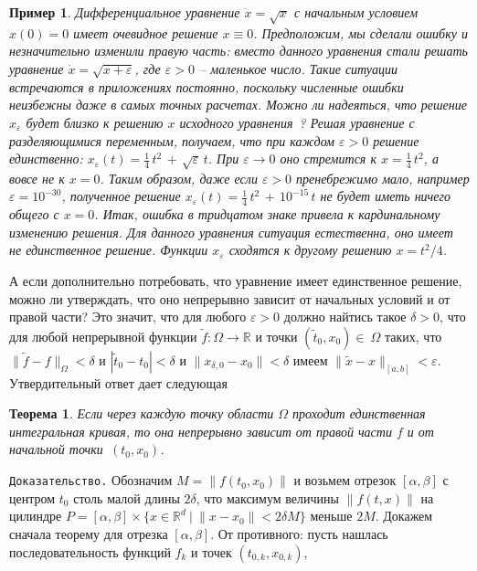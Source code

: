 \documentclass[12pt,a4paper]{article}
\newtheorem{theorem}{Теорема}
\newtheorem{ex}{Пример}
\newcommand{\re}{{\mathbb R}}
\begin{document}
\begin{ex}\label{ex.discont}
{\em Дифференциальное уравнение $\dot x = \sqrt{x}$ с начальным условием $x(0) = 0$
имеет очевидное решение $x\equiv 0$. Предположим, мы сделали ошибку и незначительно изменили правую часть:
вместо данного уравнения стали решать уравнение $\dot x = \sqrt{x + \varepsilon}$, где $\varepsilon > 0$ -- маленькое число. Такие ситуации встречаются в приложениях постоянно, поскольку численные ошибки неизбежны даже в самых точных
расчетах. Можно ли надеяться, что решение $x_{\varepsilon}$ будет  близко к решению $x$ исходного уравнения~?
 Решая уравнение с разделяющимися переменным, получаем, что при каждом $\varepsilon > 0$ решение единственно:
 $x_{\varepsilon}(t) = \frac{1}{4}\, t^2 \, +\, \sqrt{\varepsilon}\, t$. При $\varepsilon \to 0$ оно стремится к
 $x = \frac{1}{4}\, t^2$, а вовсе не к $x = 0$. Таким образом, даже если $\varepsilon > 0$ пренебрежимо мало,
 например $\varepsilon = 10^{-30}$, полученное решение $x_{\varepsilon}(t) = \frac{1}{4}\, t^2 \, +\, 10^{-15}\, t$
 не будет иметь ничего общего с $x = 0$. Итак, ошибка в тридцатом знаке привела к кардинальному изменению решения.
 Для данного уравнения ситуация естественна, оно имеет не единственное решение. Функции $x_{\varepsilon}$
 сходятся к другому решению $x = t^2/4$.}
\end{ex}
А если дополнительно потребовать, что уравнение имеет единственное решение, можно ли утверждать, что оно непрерывно
зависит от начальных условий и от правой части? Это значит, что для любого $\varepsilon > 0$ должно найтись такое
$\delta > 0$, что для любой непрерывной функции $\tilde f : \Omega \to \re$ и точки $(\tilde t_{0}, x_{0}) \in\
\Omega$ таких, что $\|\tilde f - f\|_{\Omega} < \delta$ и $|\tilde t_{0} - t_0| < \delta$ и
$\|x_{\delta , 0} - x_0\| < \delta$
имеем $\|\tilde x  - x\|_{[a, b]} < \varepsilon$. Утвердительный ответ дает следующая
\begin{theorem}\label{th.cont-cond}
Если через каждую точку области $\Omega$ проходит единственная интегральная кривая, то она непрерывно зависит от правой части $f$ и от начальной точки~$(t_0, x_0)$.
\end{theorem}
{\tt Доказательство.} Обозначим $M = \|f(t_0, x_0)\|$ и
возьмем отрезок $[\alpha , \beta]$ с центром $t_0$ столь малой длины $2\delta$, что
максимум величины $\|f(t, x)\|$ на цилиндре  $P = [\alpha , \beta ]\times \{x \in \re^d \ | \
\|x - x_0\| < 2 \delta M\}$ меньше $2M$. Докажем сначала теорему для отрезка $[\alpha, \beta]$.
От противного: пусть  нашлась последовательность функций $f_k$ и точек $(t_{0, k}, x_{0, k})$,
\end{document}
